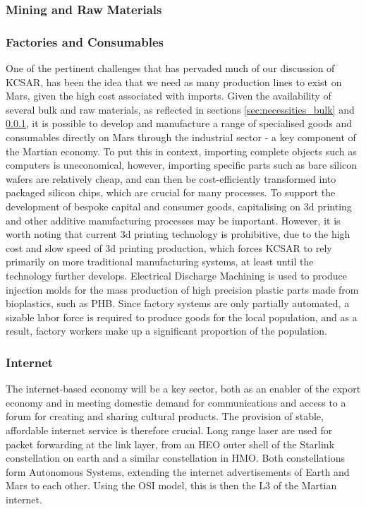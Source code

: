 \documentclass[fleqn,10pt]{Stylesheet} %
\begin{document}
\subsubsection{Mining and Raw Materials}
\label{sec:necessities_raw}



\subsubsection{Factories and Consumables}
\label{sec:necessities_consumable}

One of the pertinent challenges that has pervaded much of our discussion of KCSAR, has been the idea that we need as many production lines to exist on Mars, given the high cost associated with imports. Given the availability of several bulk and raw materials, as reflected in sections \ref{sec:necessities_bulk} and \ref{sec:necessities_raw}, it is possible to develop and manufacture a range of specialised goods and consumables directly on Mars through the industrial sector - a key component of the Martian economy. To put this in context, importing complete objects such as computers is uneconomical, however, importing specific parts such as bare silicon wafers are relatively cheap, and can then be cost-efficiently transformed into packaged silicon chips, which are crucial for many processes. To support the development of bespoke capital and consumer goods, capitalising on 3d printing and other additive manufacturing processes may be important. However, it is worth noting that current 3d printing technology is prohibitive, due to the high cost and slow speed of 3d printing production, which forces KCSAR to rely primarily on more traditional manufacturing systems, at least until the technology further develops. Electrical Discharge Machining is used to produce injection molds for the mass production of high precision plastic parts made from bioplastics, such as PHB. Since factory systems are only partially automated, a sizable labor force is required to produce goods for the local population, and as a result, factory workers make up a significant proportion of the population.

\subsubsection{Internet}
\label{sec:necessities_internet}
The internet-based economy will be a key sector, both as an enabler of the export economy and in meeting domestic demand for communications and access to a forum for creating and sharing cultural products. The provision of stable, affordable internet service is therefore crucial. Long range laser are used for packet forwarding at the link layer, from an HEO outer shell of the Starlink constellation on earth and a similar constellation in HMO. Both constellations form Autonomous Systems, extending the internet advertisements of Earth and Mars to each other. Using the OSI model, this is then the L3 of the Martian internet.
\end{document}
